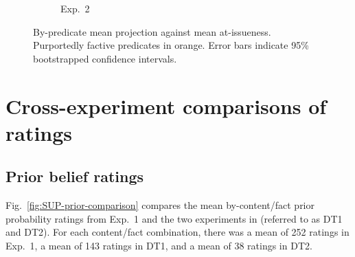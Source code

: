 \documentclass[11pt,fleqn]{article}
\newcommand{\6}{\mbox{$[\hspace*{-.6mm}[$}}
\newcommand{\9}{\mbox{$]\hspace*{-.6mm}]$}}
\begin{document}
\begin{figure}[h!]
\begin{subfigure}[t]{.49\textwidth}
\caption{Exp.~2}\label{}
 \end{subfigure}
\caption{By-predicate mean projection against mean at-issueness. Purportedly factive predicates in orange. Error bars indicate 95\% bootstrapped confidence intervals.}\label{fig:SUP-proj-by-ai}
\end{figure}

\newpage

\section{Cross-experiment comparisons of ratings}\label{a-replication}

\subsection{Prior belief ratings}

Fig.~\ref{fig:SUP-prior-comparison} compares the mean by-content/fact prior probability ratings from Exp.~1 and the two experiments in \citealt{degen-tonhauser-openmind} (referred to as DT1 and DT2). For each content/fact combination, there was a mean of 252 ratings in Exp.~1, a mean of 143 ratings in DT1, and a mean of 38 ratings in DT2.
\end{document}
